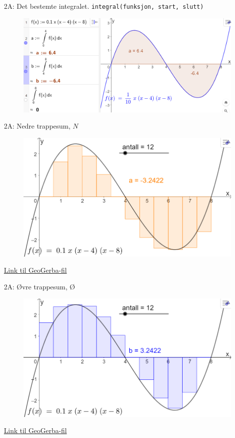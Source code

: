 \blueheader
\begin{frame}{2A: Det bestemte integralet. \texttt{integral(funksjon, start, slutt)}}
\begin{figure}
    \centering
    \includegraphics[width=\linewidth]{R2-K2A-1.png}
\end{figure}
\end{frame}

\blueheader
\begin{frame}{2A: Nedre trappesum, $N$}
\begin{figure}
    \centering
    \includegraphics[width=0.7\linewidth]{R2-K2A-6.png}
\end{figure}

\href{https://www.geogebra.org/classic/rp6mbmm6}{Link til GeoGerba-fil}
\end{frame}

\blueheader
\begin{frame}{2A: Øvre trappesum, Ø}
\begin{figure}
    \centering
    \includegraphics[width=0.7\linewidth]{R2-K2A-7.png}

\end{figure}

\href{https://www.geogebra.org/classic/rp6mbmm6}{Link til GeoGerba-fil}
\end{frame}

